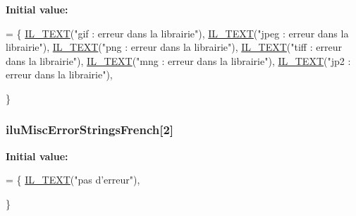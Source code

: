 {\bfseries Initial value\-:}
\begin{DoxyCode}
= \{
    \hyperlink{il_8h_a2907c2129d2ba2ebbae6aa6a69b7f685}{IL\_TEXT}(\textcolor{stringliteral}{"gif : erreur dans la librairie"}),   
    \hyperlink{il_8h_a2907c2129d2ba2ebbae6aa6a69b7f685}{IL\_TEXT}(\textcolor{stringliteral}{"jpeg : erreur dans la librairie"}),
    \hyperlink{il_8h_a2907c2129d2ba2ebbae6aa6a69b7f685}{IL\_TEXT}(\textcolor{stringliteral}{"png : erreur dans la librairie"}),
    \hyperlink{il_8h_a2907c2129d2ba2ebbae6aa6a69b7f685}{IL\_TEXT}(\textcolor{stringliteral}{"tiff : erreur dans la librairie"}),
    \hyperlink{il_8h_a2907c2129d2ba2ebbae6aa6a69b7f685}{IL\_TEXT}(\textcolor{stringliteral}{"mng : erreur dans la librairie"}),
    \hyperlink{il_8h_a2907c2129d2ba2ebbae6aa6a69b7f685}{IL\_TEXT}(\textcolor{stringliteral}{"jp2 : erreur dans la librairie"}),

\}
\end{DoxyCode}
\hypertarget{ilu__err-french_8h_acd78ccbbdd8688cae089f39df33ad365}{
\subsubsection[{ilu\-Misc\-Error\-Strings\-French}]{ ilu\-Misc\-Error\-Strings\-French\mbox{[}2\mbox{]}}}\label{ilu__err-french_8h_acd78ccbbdd8688cae089f39df33ad365}
{\bfseries Initial value\-:}
\begin{DoxyCode}
= \{
    \hyperlink{il_8h_a2907c2129d2ba2ebbae6aa6a69b7f685}{IL\_TEXT}(\textcolor{stringliteral}{"pas d'erreur"}),

\}
\end{DoxyCode}
